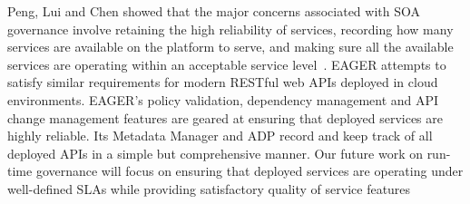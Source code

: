 Peng, Lui and Chen showed that
the major concerns associated with SOA governance involve retaining the high reliability of services, recording how many services
are available on the platform to serve, and making sure all the available services are operating within an acceptable service
level~\cite{4730489}. EAGER attempts to satisfy similar requirements for modern RESTful web APIs deployed in cloud environments. EAGER's policy
validation, dependency management and API change management features are geared at ensuring that deployed services
are highly reliable. Its Metadata Manager and ADP record and keep track of all deployed APIs in a simple but comprehensive manner.
Our future work on run-time governance will focus on ensuring that deployed services are operating under well-defined SLAs 
while providing satisfactory quality of service features
